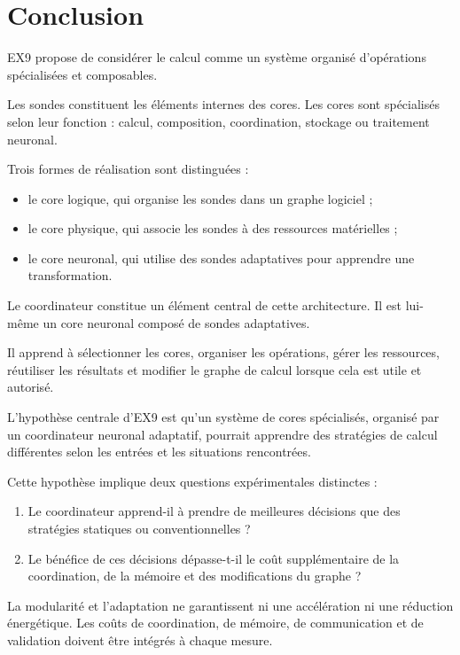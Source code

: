 \documentclass[11pt,a4paper]{article}
\begin{document}
\section{Conclusion}

EX9 propose de considérer le calcul comme un système organisé
d'opérations spécialisées et composables.

Les sondes constituent les éléments internes des cores.
Les cores sont spécialisés selon leur fonction :
calcul, composition, coordination, stockage ou traitement neuronal.

Trois formes de réalisation sont distinguées :
\begin{itemize}
  \item le core logique, qui organise les sondes dans un graphe logiciel ;
  \item le core physique, qui associe les sondes à des ressources matérielles ;
  \item le core neuronal, qui utilise des sondes adaptatives pour
        apprendre une transformation.
\end{itemize}

Le coordinateur constitue un élément central de cette architecture.
Il est lui-même un core neuronal composé de sondes adaptatives.

Il apprend à sélectionner les cores, organiser les opérations,
gérer les ressources, réutiliser les résultats et modifier le graphe
de calcul lorsque cela est utile et autorisé.

L'hypothèse centrale d'EX9 est qu'un système de cores spécialisés,
organisé par un coordinateur neuronal adaptatif, pourrait apprendre
des stratégies de calcul différentes selon les entrées et les
situations rencontrées.

Cette hypothèse implique deux questions expérimentales distinctes :

\begin{enumerate}
  \item Le coordinateur apprend-il à prendre de meilleures décisions
        que des stratégies statiques ou conventionnelles ?
  \item Le bénéfice de ces décisions dépasse-t-il le coût supplémentaire
        de la coordination, de la mémoire et des modifications du graphe ?
\end{enumerate}

La modularité et l'adaptation ne garantissent ni une accélération
ni une réduction énergétique. Les coûts de coordination, de mémoire,
de communication et de validation doivent être intégrés à chaque mesure.
\end{document}
